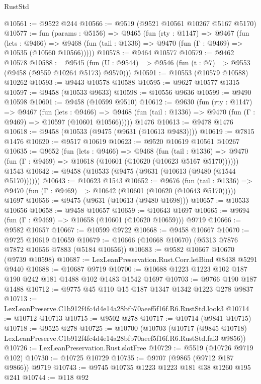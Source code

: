 \begin{lexlean}{RustStd}
\begin{coremodule}
@10561 := @9522 @244
@10566 := @9519 (@9521 @10561 @10267 @5167 @5170)
@10577 := fun (params : @5156) =>
  @9465
    (fun (rty : @1147) =>
    @9467
      (fun (lets : @9466) =>
      @9468 (fun (tail : @1336) => @9470 (fun (Γ : @9469) => @10535 (@10560 @10566)))))
@10578 := @9464 @10577
@10579 := @9462 @10578
@10588 := @9545
    (fun (U : @9544) => @9546 (fun (t : @7) => @9553 (@9458 (@9559 @10264 @5173) @9570)))
@10591 := @10553 (@10579 @10588) @10262
@10593 := @9443 @10578 @10588
@10595 := @9627 @10577 @1315
@10597 := @9458 (@10533 @9633)
@10598 := @10556 @9636
@10599 := @9490 @10598
@10601 := @9458 (@10599 @9510)
@10612 := @9630
    (fun (rty : @1147) =>
    @9467
      (fun (lets : @9466) =>
      @9468 (fun (tail : @1336) => @9470 (fun (Γ : @9469) => @10597 (@10601 @10566)))))
    @1476
@10613 := @9478 @1476
@10618 := @9458 (@10533 (@9475 (@9631 (@10613 @9483))))
@10619 := @7815 @1476
@10620 := @9517 @10619
@10623 := @9520 @10619 @10561 @10267
@10635 := @9652
    (fun (lets : @9466) =>
    @9468
      (fun (tail : @1336) =>
      @9470 (fun (Γ : @9469) => @10618 (@10601 (@10620 (@10623 @5167 @5170))))))
    @1543
@10642 := @9458 (@10533 (@9475 (@9631 (@10613 (@9480 (@1544 @5170))))))
@10643 := @10623 @1543
@10652 := @9676
    (fun (tail : @1336) => @9470 (fun (Γ : @9469) => @10642 (@10601 (@10620 (@10643 @5170)))))
    @1697
@10656 := @9475 (@9631 (@10613 (@9480 @1698)))
@10657 := @10533 @10656
@10658 := @9458 @10657
@10659 := @10643 @1697
@10665 := @9694 (fun (Γ : @9469) => @10658 (@10601 (@10620 @10659))) @9719
@10666 := @9582 @10657
@10667 := @10599 @9722
@10668 := @9458 @10667
@10670 := @9725 @10619 @10659
@10679 := @10666 (@10668 @10670) (@5313 @7876 @7872 @10656 @7883 (@5184 @10656))
@10683 := @9582 @10667 @10670 (@9739 @10598)
@10687 := LexLeanPreservation.Rust.Corr.letBind @8438 @5291 @9440
@10688 := @10687 @9719
@10700 := @10688 @1223 @1223 @102 @187 @190 @242 @181 @1488 @102 @1483 @1542 @1697
@10703 := @9766 @190 @187 @1488
@10712 := @9775 @45 @110 @15 @187 @1347 @1342 @1223 @278 @9837
@10713 := LexLeanPreserve.C1b912f4fc4d4e14a28bfb70aeef5f16f.R6.RustStd.look3
@10714 := @10712 @10713
@10715 := @9502 @278
@10717 := @10714 (@9841 @10715)
@10718 := @9525 @278
@10725 := @10700
    (@10703
      (@10717
        (@9845 @10718)
        LexLeanPreserve.C1b912f4fc4d4e14a28bfb70aeef5f16f.R6.RustStd.fal3
        @9856))
@10726 := LexLeanPreservation.Rust.slotFree
@10729 := @5519 (@10726 @9719 @102)
@10730 := @10725 @10729
@10735 := @9707 (@9865 (@9712 @187 @9866)) @9719
@10743 := @9745 @10735 @1223 @1223 @181 @38 @1260 @195 @241
@10744 := @118 @92

\end{coremodule}
\end{lexlean}
